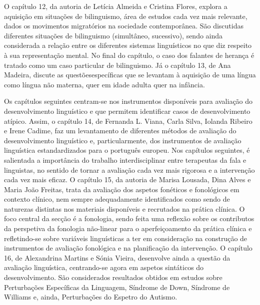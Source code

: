 \begin{refsection}
O capítulo 12, da autoria de Letícia Almeida e Cristina Flores, explora a aquisição em situações de bilinguismo, área de estudos cada vez mais relevante, dados os movimentos migratórios na sociedade contemporânea. São discutidas diferentes situações de bilinguismo (simultâneo, sucessivo), sendo ainda considerada a relação entre os diferentes sistemas linguísticos no que diz respeito à sua representação mental. No final do capítulo, o caso dos falantes de herança é tratado como um caso particular de bilinguismo. Já o capítulo 13, de Ana Madeira, discute as questões\largerpage específicas que se levantam à aquisição de uma língua como língua não materna, quer em idade adulta quer na infância. 

Os capítulos seguintes centram-se nos instrumentos disponíveis para avaliação do desenvolvimento linguístico e que permitem identificar casos de desenvolvimento atípico. Assim, o capítulo 14, de Fernanda L. Viana, Carla Silva, Iolanda Ribeiro e Irene Cadime, faz um levantamento de diferentes métodos de avaliação do desenvolvimento linguístico e, particularmente, dos instrumentos de avaliação linguística estandardizados para o português europeu. Nos capítulos seguintes, é salientada a importância do trabalho interdisciplinar entre terapeutas da fala e linguistas, no sentido de tornar a avaliação cada vez mais rigorosa e a intervenção cada vez mais eficaz. O capítulo 15, da autoria de Marisa Lousada, Dina Alves e Maria João Freitas, trata da avaliação dos aspetos fonéticos e fonológicos em contexto clínico, nem sempre adequadamente identificados como sendo de naturezas distintas nos materiais disponíveis e recrutados na prática clínica. O foco central da secção é a fonologia, sendo feita uma reflexão sobre os contributos da perspetiva da fonologia não-linear para o aperfeiçoamento da prática clínica e refletindo-se sobre variáveis linguísticas a ter em consideração na construção de instrumentos de avaliação fonológica e na planificação da intervenção. O capítulo 16, de Alexandrina Martins e Sónia Vieira, desenvolve ainda a questão da avaliação linguística, centrando-se agora em aspetos sintáticos do desenvolvimento. São considerados resultados obtidos em estudos sobre Perturbações Específicas da Linguagem, Síndrome de Down, Síndrome de Williams e, ainda, Perturbações do Espetro do Autismo. 


\end{refsection}
